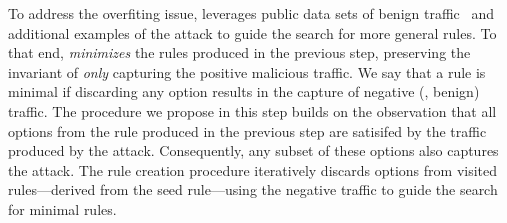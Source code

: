 \documentclass[conference]{IEEEtran}
\begin{document}

To address the overfiting issue, \tname{} leverages public data sets
of benign traffic~\cite{tcpreplay} and additional examples of the
attack to guide the search for more general rules. To that end,
\tname{} \emph{minimizes} the rules produced in the previous step,
preserving the invariant of \emph{only} capturing the positive
malicious traffic. We say that a rule is minimal if discarding any
option results in the capture of negative (\ie{}, benign) traffic.
The procedure we propose in this step builds on the observation that
all options from the rule produced in the previous step are satisifed
by the traffic produced by the attack. Consequently, any subset of
these options also captures the attack. The rule creation procedure
iteratively discards options from visited rules---derived from the
seed rule---using the negative traffic to guide the search for minimal
rules.
\end{document}
